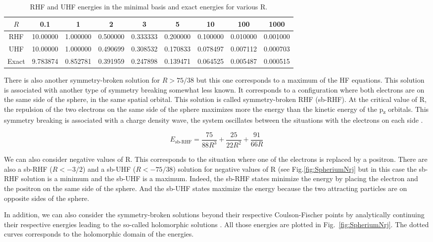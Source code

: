 \documentclass[11pt,a4paper]{article}
\begin{document}
\begin{table}[h!]
\centering
\caption{\centering RHF and UHF energies in the minimal basis and exact energies for various R.}
\begin{tabular}{ccccccccc}
\hline
\hline
$R$ & 0.1 & 1 & 2 & 3 & 5 & 10 & 100 & 1000 \\
\hline
RHF 	& 10.00000 & 1.000000 & 0.500000 & 0.333333 & 0.200000 & 0.100000 & 0.010000 & 0.001000 \\
UHF 	& 10.00000 & 1.000000 & 0.490699 & 0.308532 & 0.170833 & 0.078497 & 0.007112 & 0.000703 \\
Exact 	& 9.783874 & 0.852781 & 0.391959 & 0.247898 & 0.139471 & 0.064525 & 0.005487 & 0.000515 \\
\hline
\hline
\end{tabular}
\label{tab:ERHFvsEUHF}
\end{table}

There is also another symmetry-broken solution for $R>75/38$ but this one corresponds to a maximum of the HF equations. This solution is associated with another type of symmetry breaking somewhat less known. It corresponds to a configuration where both electrons are on the same side of the sphere, in the same spatial orbital. This solution is called symmetry-broken RHF (sb-RHF). At the critical value of R, the repulsion of the two electrons on the same side of the sphere maximizes more the energy than the kinetic energy of the p\textsubscript{z} orbitals. This symmetry breaking is associated with a charge density wave, the system oscillates between the situations with the electrons on each side \cite{GiulianiBook}.

\begin{equation}
E_{\text{sb-RHF}}=\frac{75}{88R^3}+\frac{25}{22R^2}+\frac{91}{66R}
\end{equation}

We can also consider negative values of R. This corresponds to the situation where one of the electrons is replaced by a positron. There are also a sb-RHF ($R<-3/2$) and a sb-UHF ($R<-75/38$) solution for negative values of R (see Fig.\ref{fig:SpheriumNrj} but in this case the sb-RHF solution is a minimum and the sb-UHF is a maximum. Indeed, the sb-RHF states minimize the energy by placing the electron and the positron on the same side of the sphere. And the sb-UHF states maximize the energy because the two attracting particles are on opposite sides of the sphere.

In addition, we can also consider the symmetry-broken solutions beyond their respective Coulson-Fischer points by analytically continuing their respective energies leading to the so-called holomorphic solutions \cite{Hiscock_2014, Burton_2019, Burton_2019a}. All those energies are plotted in Fig.~\ref{fig:SpheriumNrj}. The dotted curves corresponds to the holomorphic domain of the energies.
\end{document}

